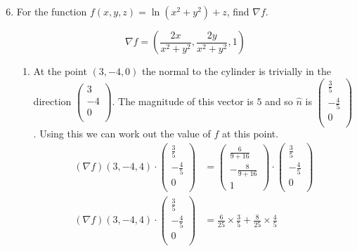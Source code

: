 \documentclass[10pt,\jkfside,a4paper]{article}
\begin{document}
\begin{enumerate}
\setcounter{enumi}{5}

\item For the function $f(x, y, z) = \ln (x^2 + y^2) + z$, find $\nabla f$.

\begin{equation}
\nabla f = \left(\frac{2x}{x^2 + y^2}, \frac{2y}{x^2 + y^2}, 1\right)
\end{equation}

\begin{enumerate}

\item At the point $(3, -4, 0)$ the normal to the cylinder is trivially in the direction 
$\begin{pmatrix} 3 \\ -4 \\ 0 \\ \end{pmatrix}$. 
The magnitude of this vector is $5$ and so $\hat{n}$ is $\begin{pmatrix} \frac{3}{5} \\ 
-\frac{4}{5} \\ 0 \\ \end{pmatrix}$. Using this we can work out the value of $f$ at this 
point.
\begin{equation}
\begin{split}
(\nabla f)(3, -4, 4)\cdot\begin{pmatrix}\frac{3}{5} \\ -\frac{4}{5} \\ 0 \\ \end{pmatrix} &= \begin{pmatrix}\frac{6}{9 + 16} \\ -\frac{8}{9 + 16} \\ 1\end{pmatrix} \cdot\begin{pmatrix}\frac{3}{5} \\ -\frac{4}{5} \\ 0 \\ \end{pmatrix} \\
(\nabla f)(3, -4, 4)\cdot\begin{pmatrix}\frac{3}{5} \\ -\frac{4}{5} \\ 0 \\ \end{pmatrix} &= \frac{6}{25}\times\frac{3}{5} + \frac{8}{25}\times\frac{4}{5} \\

\end{split}
\end{equation}
\end{enumerate}
\end{enumerate}
\end{document}
